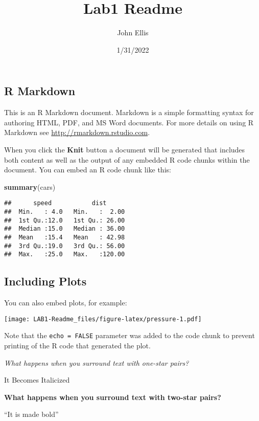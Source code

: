 \documentclass[]{article}
\title{Lab1 Readme}
\author{John Ellis}
\date{1/31/2022}
\newenvironment{Shaded}{\begin{snugshade}}{\end{snugshade}}
\newcommand{\KeywordTok}[1]{\textcolor[rgb]{0.13,0.29,0.53}{\textbf{#1}}}
\newcommand{\NormalTok}[1]{#1}
\begin{document}
\maketitle

\subsection{R Markdown}\label{r-markdown}

This is an R Markdown document. Markdown is a simple formatting syntax
for authoring HTML, PDF, and MS Word documents. For more details on
using R Markdown see \url{http://rmarkdown.rstudio.com}.

When you click the \textbf{Knit} button a document will be generated
that includes both content as well as the output of any embedded R code
chunks within the document. You can embed an R code chunk like this:

\begin{Shaded}
\begin{Highlighting}[]
\KeywordTok{summary}\NormalTok{(cars)}
\end{Highlighting}
\end{Shaded}

\begin{verbatim}
##      speed           dist       
##  Min.   : 4.0   Min.   :  2.00  
##  1st Qu.:12.0   1st Qu.: 26.00  
##  Median :15.0   Median : 36.00  
##  Mean   :15.4   Mean   : 42.98  
##  3rd Qu.:19.0   3rd Qu.: 56.00  
##  Max.   :25.0   Max.   :120.00
\end{verbatim}

\subsection{Including Plots}\label{including-plots}

You can also embed plots, for example:

\texttt{[image: LAB1-Readme\_files/figure-latex/pressure-1.pdf]}

Note that the \texttt{echo\ =\ FALSE} parameter was added to the code
chunk to prevent printing of the R code that generated the plot.

\emph{What happens when you surround text with one-star pairs?}

It Becomes Italicized

\textbf{What happens when you surround text with two-star pairs?}

``It is made bold''
\end{document}
